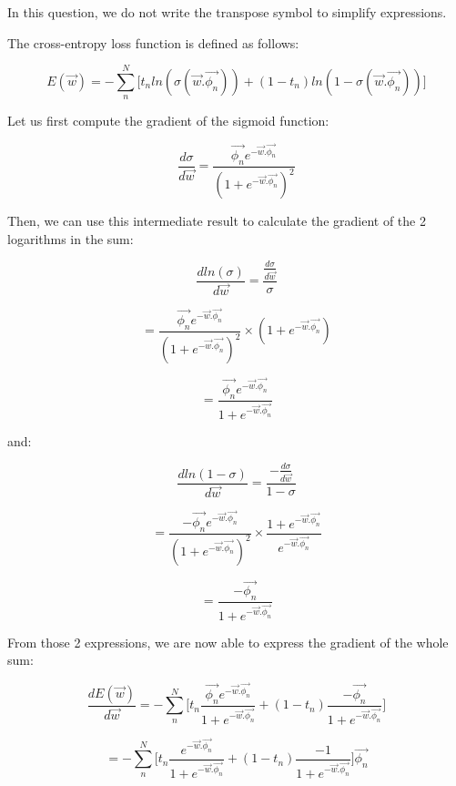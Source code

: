 \documentclass{article}
\begin{document}
In this question, we do not write the transpose symbol to simplify expressions.

\bigskip

The cross-entropy loss function is defined as follows:

$$ E(\overrightarrow{w}) = -\sum_n^N{\big[t_n ln(\sigma(\overrightarrow{w}.\overrightarrow{\phi_n})) + (1-t_n)ln(1-\sigma(\overrightarrow{w}.\overrightarrow{\phi_n}))\big]} $$

Let us first compute the gradient of the sigmoid function: 

$$\frac{d\sigma}{d\overrightarrow{w}} = \frac{\overrightarrow{\phi_n}e^{-\overrightarrow{w}.\overrightarrow{\phi_n}}}{(1+e^{-\overrightarrow{w}.\overrightarrow{\phi_n}})^2}$$

Then, we can use this intermediate result to calculate the gradient of the 2 logarithms in the sum:

$$\frac{dln(\sigma)}{d\overrightarrow{w}} =
\frac{\frac{d\sigma}{d\overrightarrow{w}}}{\sigma} $$

$$= \frac{\overrightarrow{\phi_n}e^{-\overrightarrow{w}.\overrightarrow{\phi_n}}}{(1+e^{-\overrightarrow{w}.\overrightarrow{\phi_n}})^2} \times (1+e^{-\overrightarrow{w}.\overrightarrow{\phi_n}}) $$ 

$$=
\frac{\overrightarrow{\phi_n}e^{-\overrightarrow{w}.\overrightarrow{\phi_n}}}{1+e^{-\overrightarrow{w}.\overrightarrow{\phi_n}}}
$$

and:

$$\frac{dln(1 - \sigma)}{d\overrightarrow{w}} =
\frac{-\frac{d\sigma}{d\overrightarrow{w}}}{1 - \sigma}$$

$$=\frac{-\overrightarrow{\phi_n}e^{-\overrightarrow{w}.\overrightarrow{\phi_n}}}{(1+e^{-\overrightarrow{w}.\overrightarrow{\phi_n}})^2} \times \frac{1+e^{-\overrightarrow{w}.\overrightarrow{\phi_n}}}{e^{-\overrightarrow{w}.\overrightarrow{\phi_n}}}$$

$$=\frac{-\overrightarrow{\phi_n}}{1+e^{-\overrightarrow{w}.\overrightarrow{\phi_n}}}$$

From those 2 expressions, we are now able to express the gradient of the whole sum:

$$\frac{dE(\overrightarrow{w})}{d\overrightarrow{w}} = - \sum_n^N{\Bigg[ t_n \frac{\overrightarrow{\phi_n}e^{-\overrightarrow{w}.\overrightarrow{\phi_n}}}{1+e^{-\overrightarrow{w}.\overrightarrow{\phi_n}}} + (1-t_n) \frac{-\overrightarrow{\phi_n}}{1+e^{-\overrightarrow{w}.\overrightarrow{\phi_n}}} \Bigg]}$$

$$= - \sum_n^N{\Bigg[ t_n \frac{e^{-\overrightarrow{w}.\overrightarrow{\phi_n}}}{1+e^{-\overrightarrow{w}.\overrightarrow{\phi_n}}} + (1-t_n) \frac{-1}{1+e^{-\overrightarrow{w}.\overrightarrow{\phi_n}}} \Bigg]}\overrightarrow{\phi_n}$$
\end{document}
